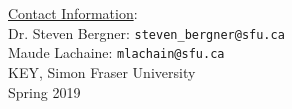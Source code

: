 \documentclass{article}
\begin{document}
\vspace{1.2cm}

\small{
\noindent
\underline{Contact Information}:\\
Dr. Steven Bergner: \texttt{steven\_bergner@sfu.ca}\\
Maude Lachaine: \texttt{mlachain@sfu.ca}\\
\noindent
KEY, Simon Fraser University\\
Spring 2019
}\\

\begin{figure}
\end{figure}
\end{document}
